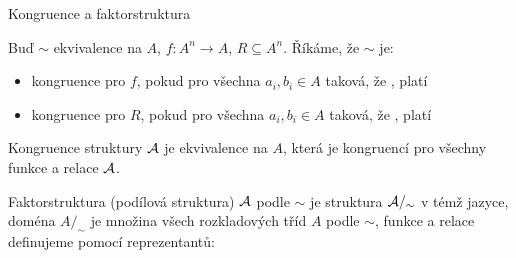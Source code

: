 \documentclass{beamer}
\begin{document}
\begin{frame}{Kongruence a faktorstruktura}
    
        Buď $\sim$ ekvivalence na $A$, $f\colon A^n\to A$, $R\subseteq A^n$. Říkáme, že $\sim$ je:
        \begin{itemize}
            \item \alert{kongruence pro $f$}, pokud pro všechna $a_i,b_i\in A$ taková, že , platí 
            \item \alert{kongruence pro $R$}, pokud pro všechna $a_i,b_i\in A$ taková, že , platí 
        \end{itemize}    
        \alert{Kongruence} struktury $\mathcal{A}$ je ekvivalence na $A$, která je kongruencí pro všechny funkce a relace $\mathcal{A}$. 
    
        \alert{Faktorstruktura (podílová struktura)} $\mathcal{A}$ podle $\sim$ je struktura \alert{$\mathcal{A}/_\sim$ } v témž jazyce, doména $A/_\sim$ je množina všech rozkladových tříd $A$ podle $\sim$, funkce a relace definujeme \alert{pomocí reprezentantů}:
        
        
\end{frame}
\end{document}
